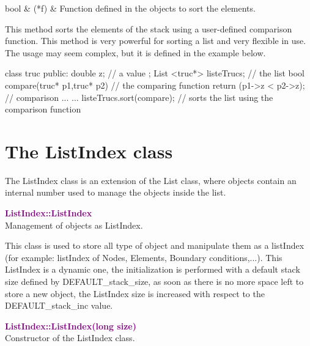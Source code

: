 \begin{tcolorbox}[width=\textwidth,myArgs,tabularx={ll|R}]
bool & (*f) & Function defined in the objects to sort the elements.
\end{tcolorbox}

This method sorts the elements of the stack using a user-defined comparison function.
This method is very powerful for sorting a list and very flexible in use.
The usage may seem complex, but it is defined in the example below.
\begin{CppListing}
class truc
{
  public:
  double z; // a value
};
List <truc*> listeTrucs; // the list
bool compare(truc* p1,truc* p2) // the comparing function
{
  return (p1->z < p2->z); // comparison
}
...
{
...
listeTrucs.sort(compare); // sorts the list using the comparison function
}
\end{CppListing}

\section{The ListIndex class}

The ListIndex class is an extension of the List class, where objects contain an internal number used to manage the objects inside the list.

\textcolor{purple}{\textbf{ListIndex::ListIndex}}\label{ListIndex::ListIndex}\\
Management of objects as ListIndex.

This class is used to store all type of object and manipulate them as a listIndex (for example: listIndex of Nodes, Elements, Boundary conditions,...).
This ListIndex is a dynamic one, the initialization is performed with a default stack size defined by DEFAULT\_stack\_size, as soon as there is no more space left to store a new object,
the ListIndex size is increased with respect to the DEFAULT\_stack\_inc value.



\textcolor{purple}{\textbf{ListIndex::ListIndex(long size)}}\label{ListIndex::ListIndex(long size)}\\
Constructor of the ListIndex class.

